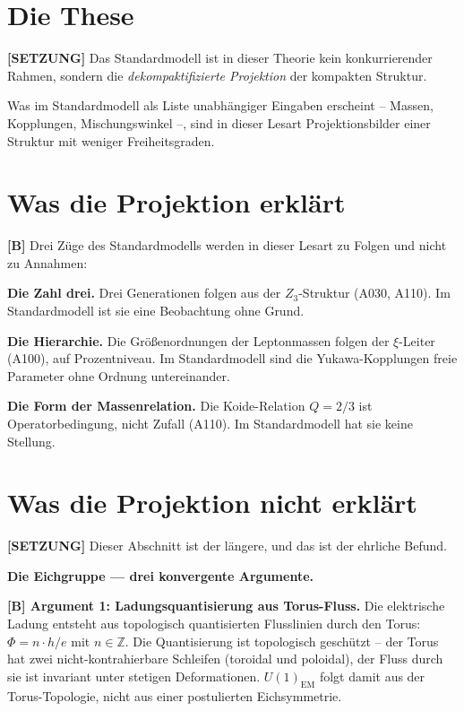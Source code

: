 \section{Die These}

\textbf{[SETZUNG]} Das Standardmodell ist in dieser Theorie kein konkurrierender
Rahmen, sondern die \emph{dekompaktifizierte Projektion} der kompakten Struktur.

Was im Standardmodell als Liste unabhängiger Eingaben erscheint -- Massen,
Kopplungen, Mischungswinkel --, sind in dieser Lesart Projektionsbilder einer
Struktur mit weniger Freiheitsgraden.

\section{Was die Projektion erklärt}

\textbf{[B]} Drei Züge des Standardmodells werden in dieser Lesart zu Folgen
und nicht zu Annahmen:

\textbf{Die Zahl drei.} Drei Generationen folgen aus der $Z_3$-Struktur
(A030, A110). Im Standardmodell ist sie eine Beobachtung ohne Grund.

\textbf{Die Hierarchie.} Die Größenordnungen der Leptonmassen folgen der
$\xi$-Leiter (A100), auf Prozentniveau. Im Standardmodell sind die
Yukawa-Kopplungen freie Parameter ohne Ordnung untereinander.

\textbf{Die Form der Massenrelation.} Die Koide-Relation $Q=2/3$ ist
Operatorbedingung, nicht Zufall (A110). Im Standardmodell hat sie keine Stellung.

\section{Was die Projektion nicht erklärt}

\textbf{[SETZUNG]} Dieser Abschnitt ist der längere, und das ist der ehrliche
Befund.

\textbf{Die Eichgruppe — drei konvergente Argumente.}

\textbf{[B] Argument 1: Ladungsquantisierung aus Torus-Fluss.}
Die elektrische Ladung entsteht aus topologisch quantisierten Flusslinien
durch den Torus: $\Phi=n\cdot h/e$ mit $n\in\mathbb{Z}$. Die Quantisierung ist
topologisch geschützt -- der Torus hat zwei nicht-kontrahierbare Schleifen
(toroidal und poloidal), der Fluss durch sie ist invariant unter stetigen
Deformationen. $U(1)_\text{EM}$ folgt damit aus der Torus-Topologie, nicht
aus einer postulierten Eichsymmetrie.

